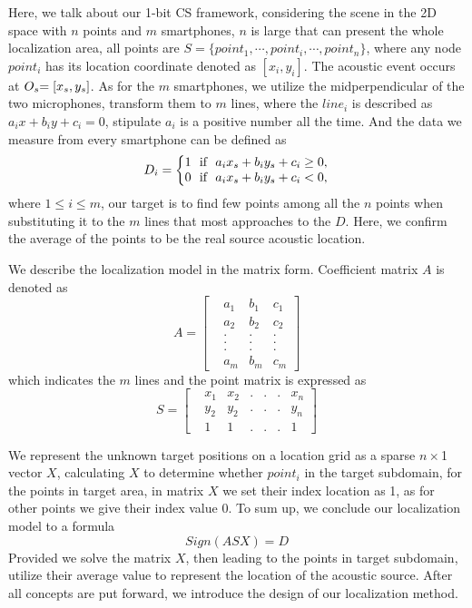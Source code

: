 Here, we talk about our 1-bit CS framework, considering the scene in the 2D space with $n$ points and $m$ smartphones, $n$ is large that can present the whole localization area, all points are ${S} = \{ {poin{t_1}}, \cdots ,{poin{t_i}}, \cdots ,{poin{t_n}}\}$, where any node ${poin{t_i}}$ has its location coordinate denoted as $[{x_i},{y_i}]$. The acoustic event occurs at ${O_s}{\rm{ = [}}{x_s},{y_s}]$. As for the $m$ smartphones, we utilize the midperpendicular of the two microphones, transform them to $m$ lines, where the ${lin{e_i}}$ is described as ${a_i}x+{b_i}y+{c_i}=0$, stipulate $a_i$ is a positive number all the time.  And the data we measure from every smartphone can be defined as
\begin{equation}\label{eq:eps}
D_{i}=
\left\{\begin{matrix}
1 ~~ $if$~~    {a_i}{x_s}+{b_i}{y_s}+{c_i}\geq0,\\
0 ~~ $if$~~   {a_i}{x_s}+{b_i}{y_s}+{c_i}<0,
\end{matrix}\right.
\end{equation}
where $1\leq i \leq m$, our target is to find few points among all the $n$ points when substituting it to the $m$ lines that most approaches to the $D$. Here, we confirm the average of the points to be the real source acoustic location.

We describe the localization model in the matrix form. Coefficient matrix $A$ is denoted as
\begin{equation}\label{eq:eps}
A=\begin{bmatrix}
&a_1  &b_1 &c_1 \\
&a_2  &b_2 &c_2\\
&.&.&. \\
&.&.&. \\
&.&.&. \\
&a_m  &b_m  &c_m
\end{bmatrix}
\end{equation}which indicates the $m$ lines and the point matrix is expressed as
\begin{equation}\label{eq:eps}
S=\begin{bmatrix}
&x_1 &x_2 &. &. &. &x_n \\
&y_2 &y_2 &. &. &. &y_n\\
&1  &1 &. &. &. &1
\end{bmatrix}
\end{equation} 


We represent the unknown target positions on a location grid as a sparse $n\times$1 vector $X$, calculating $X$ to determine whether ${poin{t_i}}$ in the target subdomain, for the points in target area, in matrix $X$ we set their index location as 1, as for other points we give their index value 0. 
To sum up, we conclude our localization model to a formula
\begin{equation}\label{eq:eps}
Sign(ASX)=D
\end{equation}
Provided we solve the matrix $X$, then leading to the points in target subdomain, utilize their average value to represent the location of the acoustic source.  After all concepts are put forward, we introduce the design of our localization method.

